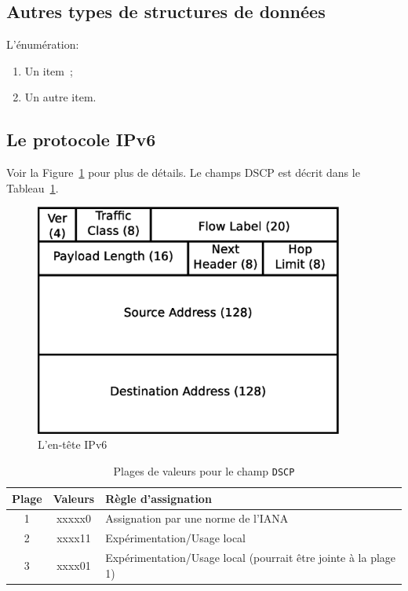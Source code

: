 \subsection{Autres types de structures de données}
L'énumération:
\begin{enumerate}
\item Un item~;
\item Un autre item.
\end{enumerate}


\subsection{Le protocole IPv6}
Voir la Figure~\ref{fig:IPv6} pour plus de détails. Le champs DSCP est
décrit dans le Tableau~\ref{tab:RangesDSCP}.

\begin{figure}[htb]
\centering
\includegraphics[width=4in]{IPv6_header}
\caption{L'en-tête IPv6}
\label{fig:IPv6}
\end{figure}

\begin{table}[htb]
\caption{Plages de valeurs pour le champ \texttt{DSCP}}
\centering
\begin{tabular}{|c|c|l|}
\hline\rowcolor[gray]{0.8}\color{black}
Plage & Valeurs & Règle d'assignation\\\hline
1 & xxxxx0 & Assignation par une norme de l'IANA\\\hline
2 & xxxx11 & Expérimentation/Usage local\\\hline
3 & xxxx01 & Expérimentation/Usage local (pourrait être jointe à la plage 1)\\\hline
\end{tabular}
\label{tab:RangesDSCP}
\end{table}

